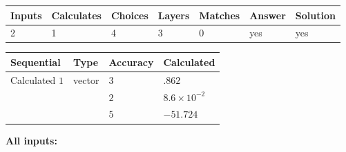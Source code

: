 \documentclass[12pt]{article}
\begin{document}
 
 
\noindent{}
 
 

 
 
\vspace{0.3in}
   
   
   
   
\noindent\begin{tabular}{|l|l|l|l|l|l|l|}
 \hline
Inputs & Calculates & Choices & Layers & Matches & Answer & Solution \\ \hline
           2 & 
           1 & 
           4
  & 
           3 & 
           0 & 
  yes & 
  yes 
  \\ \hline
 \end{tabular}
   
   
   
   
\noindent{}
   
   
  
  
\noindent\begin{tabular}{|l|l|l|l|}
\hline
 Sequential & Type & Accuracy & Calculated \\ 
\hline
 
 
  Calculated $           1$ & vector &  
  $           3 $ 
 &  $ .862 $ 
 \\    
  & & 
  $           2 $ 
 &  $ 8.6 \times 10^{-2} $ 
 \\    
  & & 
  $           5 $ 
 &  $ -51.724 $ 
 \\  \hline  
 \end{tabular}
   
   
   
   
\noindent\vspace{0.1in}\hspace{-0.08in} {\textbf{\Large{All inputs: }}}
   
   
  
\end{document}
